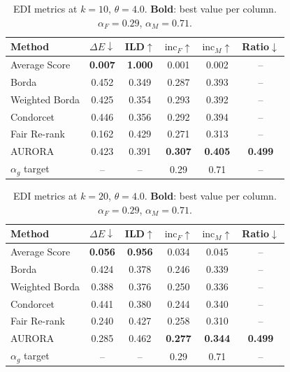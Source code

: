 \documentclass[a4paper,fleqn]{cas-dc}
\begin{document}
\begin{table}[h!]
\centering
\caption{EDI metrics at $k=10$, $\theta=4.0$. \textbf{Bold}: best value
per column. $\alpha_F=0.29$, $\alpha_M=0.71$.}
\label{tab:k10}
{
\setlength{\tabcolsep}{4pt}

\begin{tabular}{lccccc}
\hline
Method & $\Delta E\downarrow$ & ILD$\uparrow$ & $\mathrm{inc}_F\uparrow$
       & $\mathrm{inc}_M\uparrow$ & Ratio$\downarrow$ \\
\hline
Average Score & \textbf{0.007} & \textbf{1.000} & 0.001 & 0.002 & -- \\
Borda         & 0.452 & 0.349 & 0.287 & 0.393 & -- \\
Weighted Borda & 0.425 & 0.354 & 0.293 & 0.392 & -- \\
Condorcet     & 0.446 & 0.356 & 0.292 & 0.394 & -- \\
Fair Re-rank  & 0.162 & 0.429 & 0.271 & 0.313 & -- \\
AURORA          & 0.423 & 0.391 & \textbf{0.307} & \textbf{0.405} & \textbf{0.499} \\
\hline
$\alpha_g$ target & -- & -- & 0.29 & 0.71 & -- \\
\hline
\end{tabular}
}
\end{table}

\begin{table}[h!]
\centering
\caption{EDI metrics at $k=20$, $\theta=4.0$. \textbf{Bold}: best value
per column. $\alpha_F=0.29$, $\alpha_M=0.71$.}
\label{tab:k20}
{
\setlength{\tabcolsep}{4pt}

\begin{tabular}{lccccc}
\hline
Method & $\Delta E\downarrow$ & ILD$\uparrow$ & $\mathrm{inc}_F\uparrow$
       & $\mathrm{inc}_M\uparrow$ & Ratio$\downarrow$ \\
\hline
Average Score & \textbf{0.056} & \textbf{0.956} & 0.034 & 0.045 & -- \\
Borda         & 0.424 & 0.378 & 0.246 & 0.339 & -- \\
Weighted Borda & 0.388 & 0.376 & 0.250 & 0.336 & -- \\
Condorcet     & 0.441 & 0.380 & 0.244 & 0.340 & -- \\
Fair Re-rank  & 0.240 & 0.427 & 0.258 & 0.310 & -- \\
AURORA          & 0.285 & 0.462 & \textbf{0.277} & \textbf{0.344}
              & \textbf{0.499} \\
\hline
$\alpha_g$ target & -- & -- & 0.29 & 0.71 & -- \\
\hline
\end{tabular}
}
\end{table}
\end{document}
